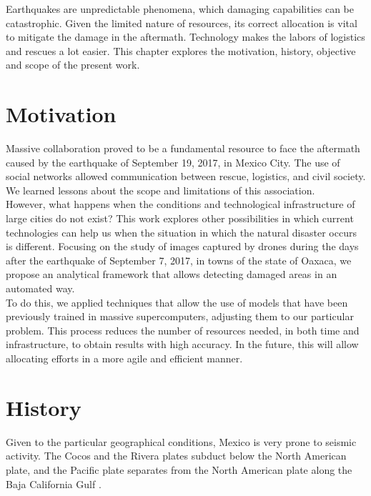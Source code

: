 Earthquakes are unpredictable phenomena, which damaging capabilities can be catastrophic. Given the limited nature of resources, its correct allocation is vital to mitigate the damage in the aftermath. Technology makes the labors of logistics and rescues a lot easier. This chapter explores the motivation, history, objective and scope of the present work.\\

\section{Motivation}

Massive collaboration proved to be a fundamental resource to face the aftermath caused by the earthquake of September 19, 2017, in Mexico City. The use of social networks allowed communication between rescue, logistics, and civil society. We learned lessons about the scope and limitations of this association.\\

However, what happens when the conditions and technological infrastructure of large cities do not exist? This work explores other possibilities in which current technologies can help us when the situation in which the natural disaster occurs is different. Focusing on the study of images captured by drones during the days after the earthquake of September 7, 2017, in towns of the state of Oaxaca, we propose an analytical framework that allows detecting damaged areas in an automated way.\\

To do this, we applied techniques that allow the use of models that have been previously trained in massive supercomputers, adjusting them to our particular problem. This process reduces the number of resources needed, in both time and infrastructure, to obtain results with high accuracy. In the future, this will allow allocating efforts in a more agile and efficient manner.\\

\section{History}

Given to the particular geographical conditions, Mexico is very prone to seismic activity. The Cocos and the Rivera plates subduct below the North American plate, and the Pacific plate separates from the North American plate along the Baja California Gulf \cite{AG3315}.\\

